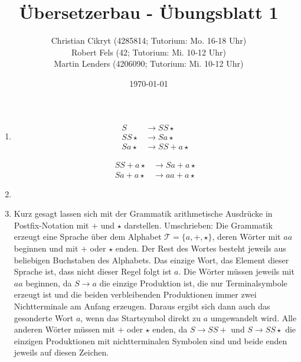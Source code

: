 \documentclass[a4paper,10pt]{scrartcl}
\title{Übersetzerbau - Übungsblatt 1}
\author{
Christian Cikryt (4285814; Tutorium: Mo. 16-18 Uhr)\\
Robert Fels (42; Tutorium: Mi. 10-12 Uhr)\\
Martin Lenders (4206090; Tutorium: Mi. 10-12 Uhr)}
\date{\today}
\begin{document}
\maketitle

\section{}
\begin{enumerate}
 \item	\begin{minipage}[t]{0.4\textwidth}
	  \begin{align*}
	    S & \to SS\star \tag{$S \to SS\star$} \\
	    SS\star & \to Sa\star \tag{$S \to a$} \\
	    Sa\star & \to SS+a\star \tag{$S \to SS+$}
	  \end{align*}
	\end{minipage}
	\begin{minipage}[t]{0.4\textwidth}
	  \begin{align*}
	    SS+a\star & \to Sa+a\star \tag{$S \to a$} \\
	    Sa+a\star & \to aa+a\star \tag{$S \to a$}
	  \end{align*}
	\end{minipage}
 \item	\begin{minipage}[t]{0.8\textwidth}
	  \centering
	\end{minipage}
 \item	Kurz gesagt lassen sich mit der Grammatik arithmetische Ausdrücke in Postfix-Notation mit $+$ und $\star$ darstellen.
	Umschrieben: Die Grammatik erzeugt eine Sprache über dem Alphabet $\mathcal{T} = \{a,
	+, \star\}$, deren Wörter mit $aa$ beginnen und mit $+$ oder $\star$
  enden.
	Der Rest des Wortes besteht jeweils aus beliebigen Buchstaben des
  Alphabets.
	Das einzige Wort, das Element dieser Sprache ist, dass nicht dieser
Regel folgt ist $a$.
	Die Wörter müssen jeweils mit $aa$ beginnen, da $S \to a$ die einzige
	Produktion ist, die nur Terminalsymbole erzeugt ist und die beiden
	verbleibenden Produktionen immer zwei Nichtterminale am Anfang erzeugen.
	Daraus ergibt sich dann auch das gesonderte Wort $a$, wenn das
Startsymbol direkt zu $a$ umgewandelt wird. 
	Alle anderen Wörter müssen mit $+$ oder $\star$ enden, da $S \to SS+$
und $S \to SS\star$ die einzigen Produktionen mit nichtterminalen Symbolen sind
 und beide enden jeweils auf diesen Zeichen.
\end{enumerate}
\end{document}
